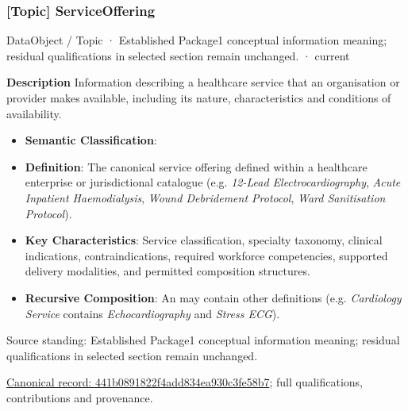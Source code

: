 \subsubsection{[Topic] ServiceOffering}

\label{element:441b0891822f4add834ea930c3fe58b7}
{\small DataObject / Topic · Established Package1 conceptual information meaning; residual qualifications in selected section remain unchanged. · current}\par

\textbf{Description}
Information describing a healthcare service that an organisation or provider makes available, including its nature, characteristics and conditions of availability.



\begin{itemize}


\item \textbf{Semantic Classification}: \texttt{}

\item \textbf{Definition}: The canonical service offering defined within a healthcare enterprise or jurisdictional catalogue (e.g. \emph{12-Lead Electrocardiography}, \emph{Acute Inpatient Haemodialysis}, \emph{Wound Debridement Protocol}, \emph{Ward Sanitisation Protocol}).

\item \textbf{Key Characteristics}: Service classification, specialty taxonomy, clinical indications, contraindications, required workforce competencies, supported delivery modalities, and permitted composition structures.

\item \textbf{Recursive Composition}: An \texttt{} may contain other \texttt{} definitions (e.g. \emph{Cardiology Service} contains \emph{Echocardiography} and \emph{Stress ECG}).

\end{itemize}


Source standing: Established Package1 conceptual information meaning; residual qualifications in selected section remain unchanged.


{\footnotesize \href{../../../../continuum/application/data-object/topic/441b0891822f4add834ea930c3fe58b7.md}{Canonical record: 441b0891822f4add834ea930c3fe58b7}; full qualifications, contributions and provenance.}\par
